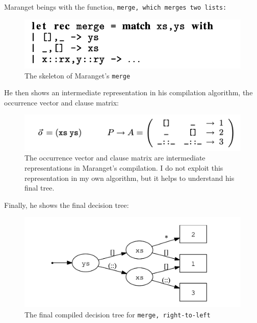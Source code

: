 \documentclass[manuscript,screen,review, 12pt, nonacm]{acmart}
\begin{document}
    Maranget beings with the function, \tt{merge}, which merges two lists: 

    \begin{figure}[H]
        \includegraphics[scale=0.7]{../images/merge.png}
        \caption{The skeleton of Maranget's \tt{merge}}
    \end{figure}

    He then shows an intermediate representation in his compilation algorithm,
    the occurrence vector and clause matrix: 

    \begin{figure}[H]
        \includegraphics[scale=0.7]{../images/occurence-and-matrix.png}
        \caption{The occurrence vector and clause matrix are intermediate
        representations in Maranget's compilation. I do not exploit this
        representation in my own algorithm, but it helps to understand his final
        tree.}
    \end{figure}

    Finally, he shows the final decision tree: 

    \begin{figure}[H]
        \includegraphics[scale=0.7]{../images/dtree.png}
        \caption{The final compiled decision tree for \tt{merge}, right-to-left}
    \end{figure}
\end{document}
